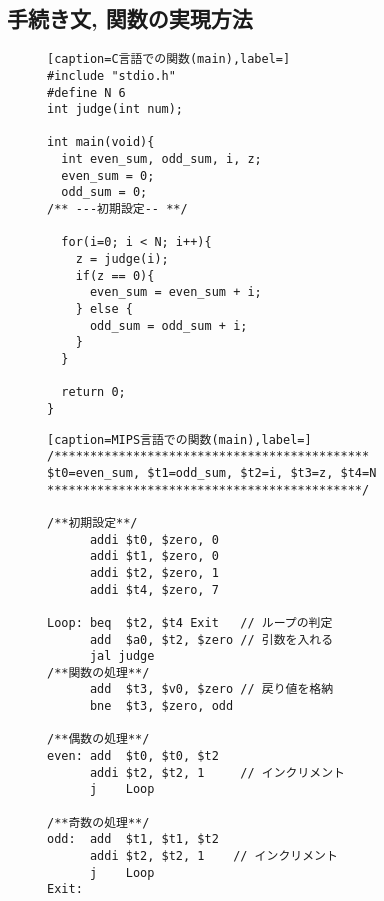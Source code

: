 \documentclass[a4paper, xelatex, ja=standard]{bxjsarticle}
\begin{document}
\subsection{手続き文, 関数の実現方法}

\begin{figure}[h]
\centering
\begin{minipage}[t]{0.3\linewidth}
\begin{lstlisting}[caption=C言語での関数(main),label=]
#include "stdio.h"
#define N 6
int judge(int num);

int main(void){
  int even_sum, odd_sum, i, z;
  even_sum = 0;
  odd_sum = 0;
/** ---初期設定-- **/

  for(i=0; i < N; i++){
    z = judge(i);
    if(z == 0){
      even_sum = even_sum + i;
    } else {
      odd_sum = odd_sum + i;
    }
  }

  return 0;
}
\end{lstlisting}
\end{minipage}
\hspace{15pt}
\begin{minipage}[t]{0.5\linewidth}
\begin{lstlisting}[caption=MIPS言語での関数(main),label=]
/********************************************
$t0=even_sum, $t1=odd_sum, $t2=i, $t3=z, $t4=N
********************************************/

/**初期設定**/
      addi $t0, $zero, 0
      addi $t1, $zero, 0
      addi $t2, $zero, 1
      addi $t4, $zero, 7

Loop: beq  $t2, $t4 Exit   // ループの判定
      add  $a0, $t2, $zero // 引数を入れる
      jal judge
/**関数の処理**/
      add  $t3, $v0, $zero // 戻り値を格納
      bne  $t3, $zero, odd

/**偶数の処理**/
even: add  $t0, $t0, $t2
      addi $t2, $t2, 1     // インクリメント
      j    Loop

/**奇数の処理**/
odd:  add  $t1, $t1, $t2
      addi $t2, $t2, 1    // インクリメント
      j    Loop
Exit:
\end{lstlisting}
\end{minipage}
\label{}
\end{figure}
\end{document}
